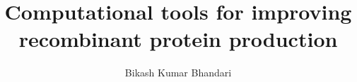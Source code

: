 \author{Bikash Kumar Bhandari}

\title{\bfseries Computational tools for improving recombinant protein production}














% 
% 
\enableManualTOCEntries

